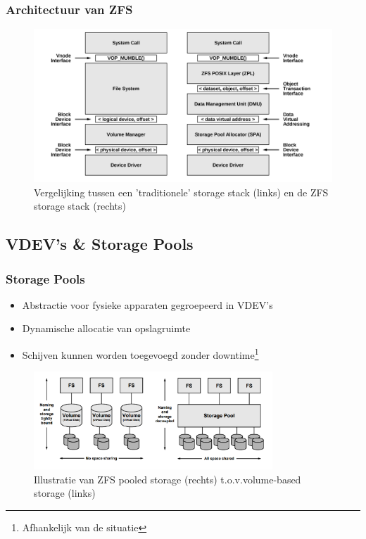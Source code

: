 \documentclass{beamer}
\begin{document}
\begin{frame}
  \frametitle{Architectuur van ZFS}
  \begin{figure}
    \centering
    \includegraphics[width=\linewidth]{img/bs-vs-zfs}
    \caption{Vergelijking tussen een 'traditionele' storage stack (links) en de ZFS storage stack (rechts) \autocite{ZFSBonwick}}
    \label{fig:bonwick_zfs_vs_fs}
  \end{figure}
\end{frame}


\subsection{VDEV's \& Storage Pools}


\begin{frame}
  \frametitle{Storage Pools}
  \begin{itemize}
    \item Abstractie voor fysieke apparaten \textbf{\textrightarrow} gegroepeerd in VDEV's
    \item Dynamische allocatie van opslagruimte
    \item Schijven kunnen worden toegevoegd zonder downtime\footnote{Afhankelijk van de situatie}    
  \end{itemize}

  \begin{figure}
    \centering
    \includegraphics[width=0.8\textwidth]{img/h3-pools-vs-vols}
    \caption{Illustratie van ZFS pooled storage (rechts) t.o.v.volume-based storage (links) \autocite{ZFSBonwick}}
    \label{fig:bonwick_pools_illustratie}
    \end{figure}
\end{frame}
\end{document}

